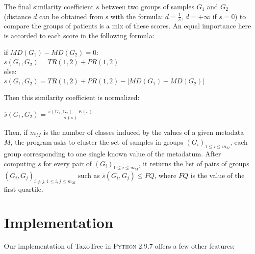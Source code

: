 \documentclass{report}
\begin{document}
The final similarity coefficient $s$ between two groups of samples $G_{1}$ and $G_{2}$ (distance $d$ can be obtained from s with the formula: $d = \frac{1}{s}$, $d = +\infty$ if $s = 0$) to compare the groups of patients is a mix of these scores. An equal importance here is accorded to each score in the following formula:\\

\begin{center}
if $MD(G_{1}) - MD(G_{2}) = 0$:\\
$s(G_{1},G_{2}) = TR(1,2) + PR(1,2)$\\

else:\\
$s(G_{1},G_{2}) = TR(1,2) + PR(1,2) - | MD(G_{1}) - MD(G_{2}) |$\\
\end{center}

Then this similarity coefficient is normalized:\\
\begin{center}
$\overline{s}(G_{1},G_{2}) = \frac{s(G_{1},G_{2}) - E(s)}{\sigma(s)}$\\
\end{center}

Then, if $m_{M}$ is the number of classes induced by the values of a given metadata $M$, the program asks to cluster the set of samples in groups $(G_{i})_{1 \le i \le m_{M}}$, each group corresponding to one single known value of the metadatum. After computing $\overline{s}$ for every pair of $(G_{i})_{1 \le i \le m_{M}}$, it returns the list of pairs of groups $(G_{i},G_{j})_{i \neq j, 1 \le i,j \le m_{M}}$ such as $\overline{s}(G_{i},G_{j}) \le FQ$, where $FQ$ is the value of the first quartile. 

\section{Implementation}

Our implementation of TaxoTree in \textsc{Python 2.9.7} offers a few other features:
\end{document}
